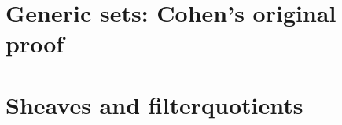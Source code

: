 \documentclass[11pt]{article}
\begin{document}
\section{Generic sets: Cohen's original proof}

\section{Sheaves and filterquotients}
\end{document}
